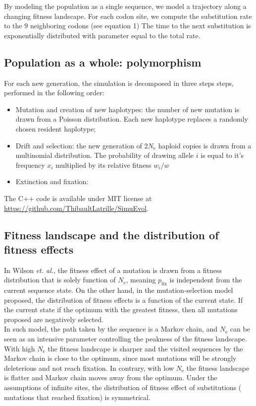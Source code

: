 \documentclass{article}
\newcommand{\e}{\mathrm{e}}
\newcommand{\Ne}{N_\e}
\begin{document}
By modeling the population as a single sequence, we model a trajectory along a changing fitness landscape.
For each codon site, we compute the substitution rate to the $9$ neighboring codons (see equation 1)  
The time to the next substitution is exponentially distributed with parameter equal to the total rate.



\subsection{Population as a whole: polymorphism}

For each new generation, the simulation is decomposed in three steps
steps, performed in the following order:
\begin{itemize}
	\setlength\itemsep{-0.25em}
	\item  Mutation and creation of new haplotypes: the number of new mutation is drawn from a
	Poisson distribution. Each new haplotype replaces a randomly chosen resident
	haplotype;
	\item Drift and selection: the new generation of 2$\Ne$ haploid copies is drawn from a multinomial
	distribution. The probability of drawing allele $i$ is equal to it’s frequency $x_i$ multiplied by
	its relative fitness $w_i / w$
	\item Extinction and fixation: 
\end{itemize}

The C++ code is available under MIT license at \url{https://github.com/ThibaultLatrille/SimuEvol}.

\subsection{Fitness landscape and the distribution of fitness effects}

In Wilson \textit{et. al.}, the fitness effect of a mutation is drawn from a fitness distribution that is solely function of $\Ne$, meaning ${p_{\mathrm{fix}}}$ is independent from the current sequence state.
On the other hand, in the mutation-selection model proposed, the distribution of fitness effects is a function of the current state.
If the current state if the optimum with the greatest fitness, then all mutations proposed are negatively selected.\\

In such model, the path taken by the sequence is a Markov chain, and $\Ne$ can be seen as an intensive parameter controlling the peakness of the fitness landscape. With high $\Ne$ the fitness landscape is sharper and the visited sequences by the Markov chain is close to the optimum, since most mutations will be strongly deleterious and not reach fixation. In contrary, with low $\Ne$ the fitness landscape is flatter and Markov chain moves away from the optimum.
Under the assumptions of infinite sites, the distribution of fitness effect of substitutions ( mutations that reached fixation) is symmetrical.
\end{document}

